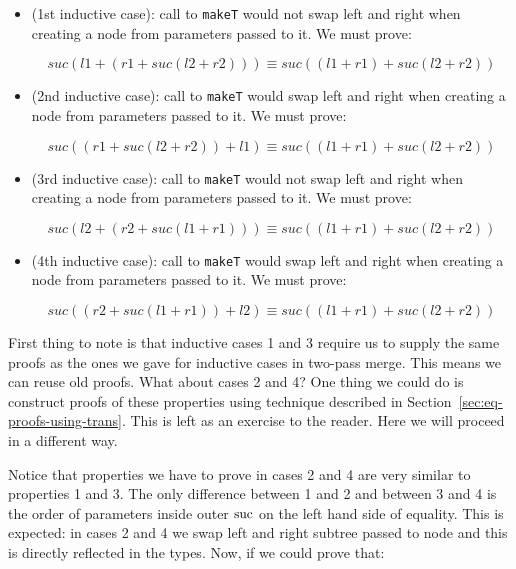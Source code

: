 \begin{itemize}
 \item (1st inductive case): call to \texttt{makeT} would not swap left and right when creating a node from parameters passed to it. We must prove:

\begin{equation*}
suc (l1 + (r1 + suc (l2 + r2))) ≡ suc ((l1 + r1) + suc (l2 + r2))
\end{equation*}

\item (2nd inductive case): call to \texttt{makeT} would swap left and right when creating a node from parameters passed to it. We must prove:

\begin{equation*}
suc ((r1 + suc (l2 + r2)) + l1) ≡ suc ((l1 + r1) + suc (l2 + r2))
\end{equation*}

\item (3rd inductive case): call to \texttt{makeT} would not swap left and right when creating a node from parameters passed to it. We must prove:

\begin{equation*}
suc (l2 + (r2  + suc (l1 + r1))) ≡ suc ((l1 + r1) + suc (l2 + r2))
\end{equation*}

\item (4th inductive case): call to \texttt{makeT} would swap left and right when creating a node from parameters passed to it. We must prove:

\begin{equation*}
suc ((r2 + suc (l1 + r1)) + l2) ≡ suc ((l1 + r1) + suc (l2 + r2))
\end{equation*}
\end{itemize}

First thing to note is that inductive cases 1 and 3 require us to supply the same proofs as the ones we gave for inductive cases in two-pass merge. This means we can reuse old proofs. What about cases 2 and 4? One thing we could do is construct proofs of these properties using technique described in Section~\ref{sec:eq-proofs-using-trans}. This is left as an exercise to the reader. Here we will proceed in a different way.

Notice that properties we have to prove in cases 2 and 4 are very similar to properties 1 and 3. The only difference between 1 and 2 and between 3 and 4 is the order of parameters inside outer $\operatorname{suc}$ on the left hand side of equality. This is expected: in cases 2 and 4 we swap left and right subtree passed to node and this is directly reflected in the types.  Now, if we could prove that:

